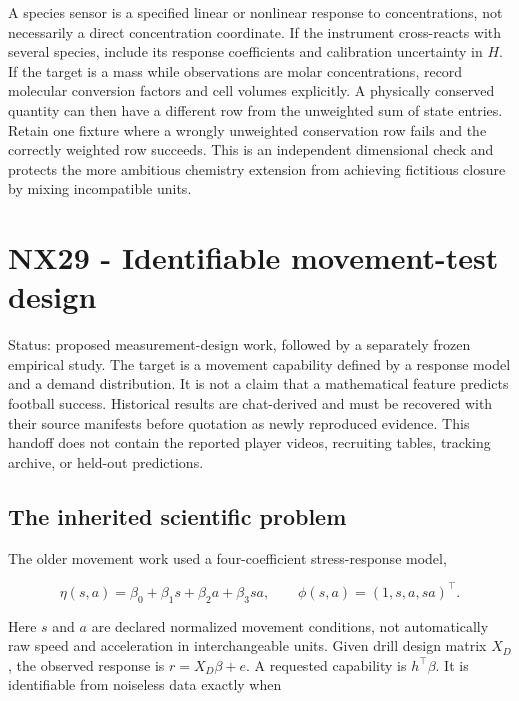 \documentclass[
  11pt,
  a4paper,
]{report}
\begin{document}
A species sensor is a specified linear or nonlinear response to
concentrations, not necessarily a direct concentration coordinate. If
the instrument cross-reacts with several species, include its response
coefficients and calibration uncertainty in \(H\). If the target is a
mass while observations are molar concentrations, record molecular
conversion factors and cell volumes explicitly. A physically conserved
quantity can then have a different row from the unweighted sum of state
entries. Retain one fixture where a wrongly unweighted conservation row
fails and the correctly weighted row succeeds. This is an independent
dimensional check and protects the more ambitious chemistry extension
from achieving fictitious closure by mixing incompatible units.

\hypertarget{nx29---identifiable-movement-test-design}{%
\chapter{NX29 - Identifiable movement-test
design}\label{nx29---identifiable-movement-test-design}}

Status: proposed measurement-design work, followed by a separately
frozen empirical study. The target is a movement capability defined by a
response model and a demand distribution. It is not a claim that a
mathematical feature predicts football success. Historical results are
chat-derived and must be recovered with their source manifests before
quotation as newly reproduced evidence. This handoff does not contain
the reported player videos, recruiting tables, tracking archive, or
held-out predictions.

\hypertarget{the-inherited-scientific-problem}{%
\section{The inherited scientific
problem}\label{the-inherited-scientific-problem}}

The older movement work used a four-coefficient stress-response model,

\[
 \eta(s,a)=\beta_0+\beta_1s+\beta_2a+\beta_3sa,
 \qquad \phi(s,a)=(1,s,a,sa)^\top.
\]

Here \(s\) and \(a\) are declared normalized movement conditions, not
automatically raw speed and acceleration in interchangeable units. Given
drill design matrix \(X_D\), the observed response is \(r=X_D\beta+e\).
A requested capability is \(h^\top\beta\). It is identifiable from
noiseless data exactly when
\end{document}
